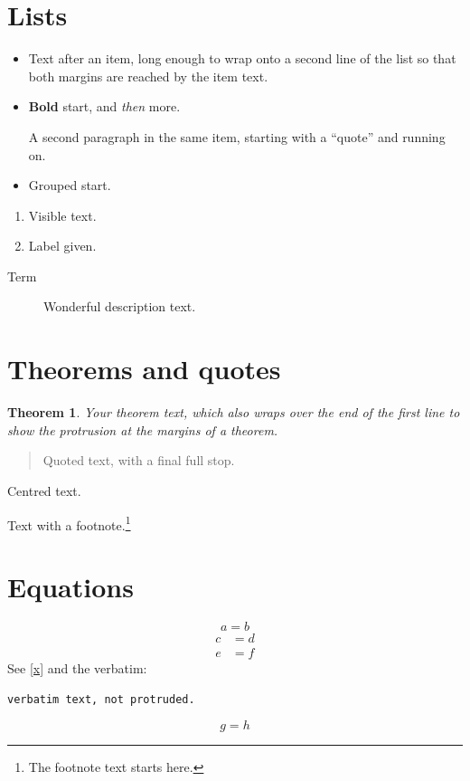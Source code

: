 \documentclass{article}
\newtheorem{theorem}{Theorem}
\begin{document}
\section{Lists}
\begin{itemize}
\item Text after an item, long enough to wrap onto a second line of the list so that
both margins are reached by the item text.
\item \textbf{Bold} start, and \emph{then} more.

A second paragraph in the same item, starting with a ``quote'' and running on.
\item {Grouped} start.
\end{itemize}
\begin{enumerate}
\item Visible text. \item[(x)] Label given.
\end{enumerate}
\begin{description}
\item[Term] Wonderful description text.
\end{description}
\section{Theorems and quotes}
\begin{theorem}
Your theorem text, which also wraps over the end of the first line to show the
protrusion at the margins of a theorem.
\end{theorem}
\begin{quote}
Quoted text, with a final full stop.
\end{quote}
\begin{center}
Centred text.
\end{center}
Text with a footnote.\footnote{The footnote text starts here.}
\section{Equations}
\begin{equation}
a = b
\end{equation}
\begin{align}
c &= d \\
e &= f \tag{T}
\end{align}
See \eqref{x} and the verbatim:
\begin{verbatim}
verbatim text, not protruded.
\end{verbatim}
\begin{equation}\label{x}
g = h
\end{equation}
\end{document}
